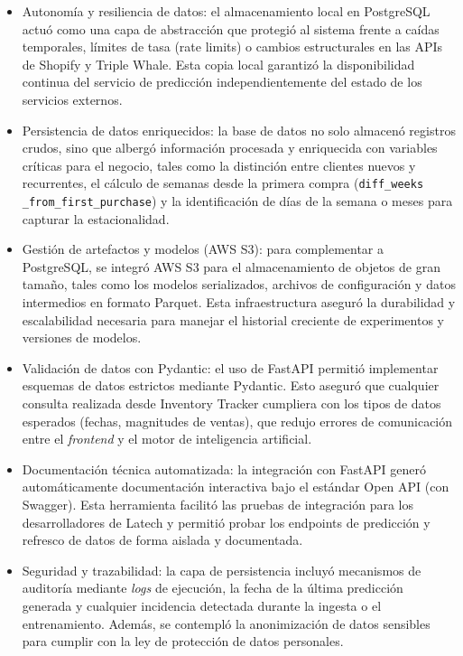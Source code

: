 \begin{itemize}

	\item Autonomía y resiliencia de datos: el almacenamiento local en PostgreSQL actuó como una capa de abstracción que protegió al sistema frente a caídas temporales, límites de tasa (rate limits) o cambios estructurales en las APIs de Shopify y Triple Whale. Esta copia local garantizó la disponibilidad continua del servicio de predicción independientemente del estado de los servicios externos.
	\item Persistencia de datos enriquecidos: la base de datos no solo almacenó registros crudos, sino que albergó información procesada y enriquecida con variables críticas para el negocio, tales como la distinción entre clientes nuevos y recurrentes, el cálculo de semanas desde la primera compra (\texttt{diff\_weeks \_from\_first\_purchase}) y la identificación de días de la semana o meses para capturar la estacionalidad.
	\item Gestión de artefactos y modelos (AWS S3): para complementar a PostgreSQL, se integró AWS S3 para el almacenamiento de objetos de gran tamaño, tales como los modelos serializados, archivos de configuración y datos intermedios en formato Parquet. Esta infraestructura aseguró la durabilidad y escalabilidad necesaria para manejar el historial creciente de experimentos y versiones de modelos.
	\item Validación de datos con Pydantic: el uso de FastAPI permitió implementar esquemas de datos estrictos mediante Pydantic. Esto aseguró que cualquier consulta realizada desde Inventory Tracker cumpliera con los tipos de datos esperados (fechas, magnitudes de ventas), que redujo errores de comunicación entre el \textit{frontend} y el motor de inteligencia artificial.
	\item Documentación técnica automatizada: la integración con FastAPI generó automáticamente documentación interactiva bajo el estándar Open API (con Swagger). Esta herramienta facilitó las pruebas de integración para los desarrolladores de Latech y permitió probar los endpoints de predicción y refresco de datos de forma aislada y documentada.
	\item Seguridad y trazabilidad: la capa de persistencia incluyó mecanismos de auditoría mediante \textit{logs} de ejecución, la fecha de la última predicción generada y cualquier incidencia detectada durante la ingesta o el entrenamiento. Además, se contempló la anonimización de datos sensibles para cumplir con la ley de protección de datos personales.

\end{itemize}



